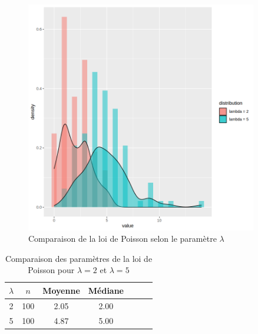       \begin{table}[H]
        \centering
        \begin{minipage}{0.45\textwidth}

          \begin{figure}[H]
            \centering
            \includegraphics[width=0.9\textwidth]{4_attachments/figures/output7.png}
            \caption{Comparaison de la loi de Poisson selon le paramètre $\lambda$}
            \label{fig:poisson_lambda}
          \end{figure}
        \end{minipage}
        \hfill
        \begin{minipage}{0.45\textwidth}
          \centering
          \begin{table}[H]
            \centering
            \begin{tabular}{c c c c c c c}
              \toprule
              $\lambda$ & $n$ & Moyenne & Médiane \\
              \midrule
              2 & 100 & 2.05 & 2.00 \\
              5 & 100 & 4.87 & 5.00 \\
              \bottomrule
            \end{tabular}
            \caption{Comparaison des paramètres de la loi de Poisson pour $\lambda=2$ et $\lambda=5$}
            \label{tab:poisson_lambda}
          \end{table}
        \end{minipage}
      \end{table}